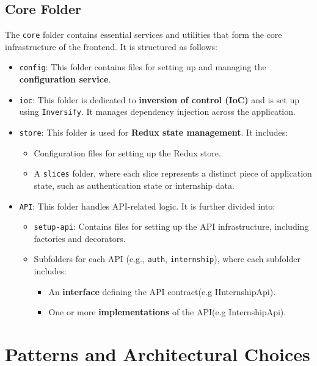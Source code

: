 \subsection{Core Folder}
The \texttt{core} folder contains essential services and utilities that form the core infrastructure of the frontend. It is structured as follows:

\begin{itemize}
    \item \texttt{config}: This folder contains files for setting up and managing the \textbf{configuration service}.
    \item \texttt{ioc}: This folder is dedicated to \textbf{inversion of control (IoC)} and is set up using \texttt{Inversify}. It manages dependency injection across the application.
    \item \texttt{store}: This folder is used for \textbf{Redux state management}. It includes:
    \begin{itemize}
        \item Configuration files for setting up the Redux store.
        \item A \texttt{slices} folder, where each slice represents a distinct piece of application state, such as authentication state or internship data.
    \end{itemize}
    \item \texttt{API}: This folder handles API-related logic. It is further divided into:
    \begin{itemize}
        \item \texttt{setup-api}: Contains files for setting up the API infrastructure, including factories and decorators.
        \item Subfolders for each API (e.g., \texttt{auth}, \texttt{internship}), where each subfolder includes:
        \begin{itemize}
            \item An \textbf{interface} defining the API contract(e.g IInternshipApi).
            \item One or more \textbf{implementations} of the API(e.g InternshipApi).
        \end{itemize}
    \end{itemize}
\end{itemize}

\section{Patterns and Architectural Choices}

